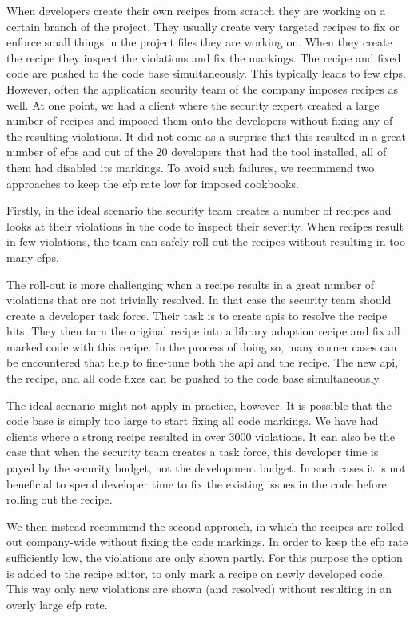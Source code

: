 When developers create their own recipes from scratch they are working on a certain branch of the project.
They usually create very targeted recipes to fix or enforce small things in the project files they are working on.
When they create the recipe they inspect the violations and fix the markings.
The recipe and fixed code are pushed to the code base simultaneously.
This typically leads to few \glspl{efp}.
However, often the application security team of the company imposes recipes as well.
At one point, we had a client where the security expert created a large number of recipes and imposed them onto the developers without fixing any of the resulting violations.
It did not come as a surprise that this resulted in a great number of \glspl{efp} and out of the 20 developers that had the tool installed, all of them had disabled its markings.
To avoid such failures, we recommend two approaches to keep the \gls{efp} rate low for imposed cookbooks.

Firstly, in the ideal scenario the security team creates a number of recipes and looks at their violations in the code to inspect their severity.
When recipes result in few violations, the team can safely roll out the recipes without resulting in too many \glspl{efp}.

The roll-out is more challenging when a recipe results in a great number of violations that are not trivially resolved.
In that case the security team should create a developer task force.
Their task is to create \glspl{api} to resolve the recipe hits.
They then turn the original recipe into a library adoption recipe and fix all marked code with this recipe.
In the process of doing so, many corner cases can be encountered that help to fine-tune both the \gls{api} and the recipe.
The new \gls{api}, the recipe, and all code fixes can be pushed to the code base simultaneously. 

The ideal scenario might not apply in practice, however.
It is possible that the code base is simply too large to start fixing all code markings.
We have had clients where a strong recipe resulted in over 3000 violations.
It can also be the case that when the security team creates a task force, this developer time is payed by the security budget, not the development budget.
In such cases it is not beneficial to spend developer time to fix the existing issues in the code before rolling out the recipe. 

We then instead recommend the second approach, in which the recipes are rolled out company-wide without fixing the code markings.
In order to keep the \gls{efp} rate sufficiently low, the violations are only shown partly.
For this purpose the option is added to the recipe editor, to only mark a recipe on newly developed code.
This way only new violations are shown (and resolved) without resulting in an overly large \gls{efp} rate.